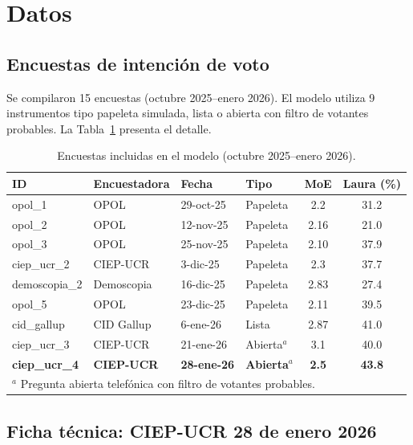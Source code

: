 \documentclass[11pt,a4paper]{article}
\begin{document}
\section{Datos}

\subsection{Encuestas de intención de voto}

Se compilaron 15 encuestas (octubre 2025--enero 2026). El modelo utiliza 9 instrumentos tipo papeleta simulada, lista o abierta con filtro de votantes probables. La Tabla~\ref{tab:encuestas} presenta el detalle.

\begin{table}[H]
\centering
\caption{Encuestas incluidas en el modelo (octubre 2025--enero 2026).}
\label{tab:encuestas}
\small
\begin{tabular}{@{}llllcc@{}}
\toprule
\textbf{ID} & \textbf{Encuestadora} & \textbf{Fecha} & \textbf{Tipo} & \textbf{MoE} & \textbf{Laura (\%)} \\
\midrule
opol\_1 & OPOL & 29-oct-25 & Papeleta & 2.2 & 31.2 \\
opol\_2 & OPOL & 12-nov-25 & Papeleta & 2.16 & 21.0 \\
opol\_3 & OPOL & 25-nov-25 & Papeleta & 2.10 & 37.9 \\
ciep\_ucr\_2 & CIEP-UCR & 3-dic-25 & Papeleta & 2.3 & 37.7 \\
demoscopia\_2 & Demoscopia & 16-dic-25 & Papeleta & 2.83 & 27.4 \\
opol\_5 & OPOL & 23-dic-25 & Papeleta & 2.11 & 39.5 \\
cid\_gallup & CID Gallup & 6-ene-26 & Lista & 2.87 & 41.0 \\
ciep\_ucr\_3 & CIEP-UCR & 21-ene-26 & Abierta$^a$ & 3.1 & 40.0 \\
\textbf{ciep\_ucr\_4} & \textbf{CIEP-UCR} & \textbf{28-ene-26} & \textbf{Abierta$^a$} & \textbf{2.5} & \textbf{43.8} \\
\bottomrule
\multicolumn{6}{l}{\footnotesize $^a$ Pregunta abierta telefónica con filtro de votantes probables.}
\end{tabular}
\end{table}

\subsection{Ficha técnica: CIEP-UCR 28 de enero 2026}
\end{document}
